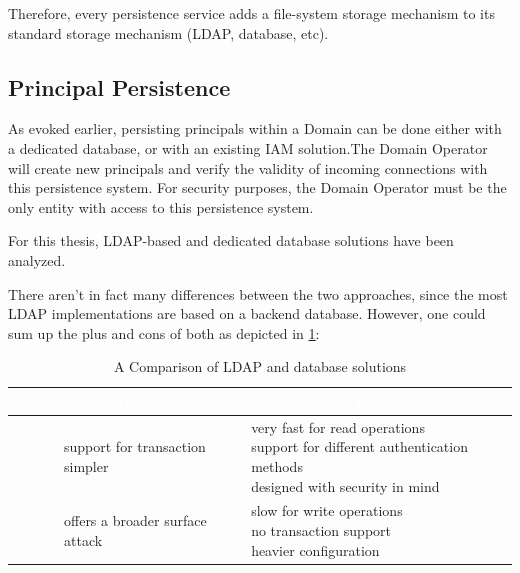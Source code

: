 Therefore, every persistence service adds a file-system storage mechanism to its standard storage mechanism (LDAP, database, etc).

\subsection{Principal Persistence}

As evoked earlier, persisting principals within a Domain can be done either with a dedicated database, or with an existing IAM solution.The Domain Operator will create new principals and verify the validity of incoming connections with this persistence system. For security purposes, the Domain Operator must be the only entity with access to this persistence system.

For this thesis, LDAP-based and dedicated database solutions have been analyzed. 

There aren't in fact many differences between the two approaches, since the most LDAP implementations are based on a backend database. However, one could sum up the plus and cons of both as depicted in \ref{tab:ldap_db}:

\begin{table}[h]
	\caption{A Comparison of LDAP and database solutions}
	\centering
	\label{tab:ldap_db}
	\begin{tabular}{|c|l|l|}
		\cline{2-3}
		\multicolumn{1}{c|}{} & 
		\multicolumn{1}{|c|}{\cellcolor{Gray}\textcolor{white}{\textbf{Database}}} & 
		\multicolumn{1}{|c|}{\cellcolor{Gray}\textcolor{white}{\textbf{LDAP}}} \\
		\hline
		\cellcolor{Gray}\textcolor{white}{\textbf{Plus}} &
		\pbox{0.4\linewidth}{
			\vspace{0.5em}
			\textbullet \quad support for transaction \\
			\textbullet \quad simpler
		} & 
		\pbox{0.4\linewidth}{
			\vspace{0.5em}
			\textbullet \quad very fast for read operations \\
			\textbullet \quad support for different authentication methods \\
			\textbullet \quad designed with security in mind
		} \\
		\hline
		\cellcolor{Gray}\textcolor{white}{\textbf{Cons}} &
		\pbox{0.4\linewidth}{
			\vspace{0.5em}
			\textbullet \quad offers a broader surface attack \\
		} & 
		\pbox{0.4\linewidth}{
			\vspace{0.5em}
			\textbullet \quad slow for write operations \\
			\textbullet \quad no transaction support \\
			\textbullet \quad heavier configuration
		} \\
		\hline
	\end{tabular}
\end{table}

